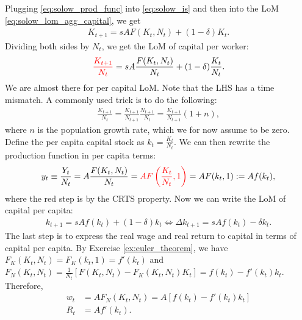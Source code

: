 \documentclass{book}
\theoremstyle{definition}
\theoremstyle{plain}
\begin{document}
Plugging \eqref{eq:solow_prod_func} into \eqref{eq:solow_is} and then into the LoM \eqref{eq:solow_lom_agg_capital}, we get
\begin{align}\label{eq:lom_capital_subs}
    K_{t+1} = s A F(K_t, N_t) + (1-\delta) K_t.
\end{align}
Dividing both sides by $N_t$, we get the LoM of capital per worker:
\begin{align}\label{eq:lom_capital_pc_preliminary}
    {\color{red}\frac{K_{t+1}}{N_t}} = s A \frac{F(K_t, N_t)}{N_t} + (1-\delta)\frac{K_t}{N_t}.
\end{align}
We are almost there for per capital LoM. Note that the LHS has a time mismatch. A commonly used trick is to do the following:
\begin{align*}
    \frac{K_{t+1}}{N_t} = \frac{K_{t+1}}{N_{t+1}} \frac{N_{t+1}}{N_t} = \frac{K_{t+1}}{N_{t+1}} (1+n),
\end{align*}
where $n$ is the population growth rate, which we for now assume to be zero. Define the per capita capital stock as $k_t = \frac{K_t}{N_t}$. We can then rewrite the production function in per capita terms:
\begin{align}
    y_t \equiv \frac{Y_t}{N_t} = A \frac{F(K_t, N_t)}{N_t} = {\color{red}A F\left(\frac{K_t}{N_t}, 1\right)} = A F(k_t, 1) := A f(k_t),
\end{align}
where the red step is by the CRTS property. Now we can write the LoM of capital per capita:
\begin{align}\label{eq:lom_capital_pc}
    k_{t+1} = s A f(k_t) + (1-\delta)k_t \iff \Delta k_{t+1} = s A f(k_t) - \delta k_t.
\end{align}
The last step is to express the real wage and real return to capital in terms of capital per capita. By Exercise \ref{ex:euler_theorem}, we have $F_K(K_t, N_t) = F_K(k_t, 1) = f'(k_t)$ and $F_N(K_t, N_t) = \frac{1}{N_t} [F(K_t, N_t) - F_K(K_t, N_t) K_t] = f(k_t) - f'(k_t) k_t$. Therefore,
\begin{align}
    w_t &= A F_N(K_t, N_t) = A [f(k_t) - f'(k_t) k _t] \label{eq:real_wage_pc} \\
    R_t &= A f'(k_t). \label{eq:real_return_capital_pc}
\end{align}
\end{document}
